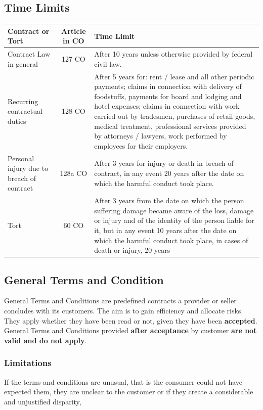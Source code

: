\documentclass[11pt]{article}
\theoremstyle{definition}
\begin{document}
\subsection{Time Limits}
\begin{tabularx}{\linewidth}{l c X}
	\hline
	\textbf{Contract or Tort} & \textbf{Article in CO} & \textbf{Time Limit}\\
	\hline
	Contract Law in general & 127 CO & After 10 years unless otherwise provided by federal civil law.\\
	Recurring contractual duties & 128 CO & After 5 years for: rent / lease and all other periodic payments; claims in connection with delivery of foodstuffs, payments for board and lodging and hotel expenses; claims in connection with work carried out by tradesmen, purchases of retail goods, medical treatment, professional services provided by attorneys / lawyers, work performed by employees for their employers.\\
	Personal injury due to breach of contract & 128a CO & After 3 years for injury or death in breach of contract, in any event 20 years after the date on which the harmful conduct took place.\\
	Tort & 60 CO & After 3 years from the date on which the person suffering damage became aware of the loss, damage or injury and of the identity of the person liable for it, but in any event 10 years after the date on which the harmful conduct took place, in cases of death or injury, 20 years
\end{tabularx}

\subsection{General Terms and Condition}
General Terms and Conditions are predefined contracts a provider or seller concludes with its customers. The aim is to gain efficiency and allocate risks. They apply whether they have been read or not, given they have been \textbf{accepted}. General Terms and Conditions provided \textbf{after acceptance} by customer \textbf{are not valid and do not apply}.

\subsubsection{Limitations}
If the terms and conditions are unusual, that is the consumer could not have expected them, they are unclear to the customer or if they create a considerable and unjustified disparity,
\end{document}
